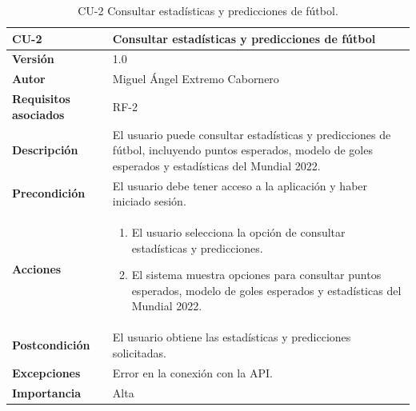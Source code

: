 \begin{table}[p]
    \centering
    \begin{tabularx}{\linewidth}{ p{} p{} }
        \toprule
        \textbf{CU-2}    & \textbf{Consultar estadísticas y predicciones de fútbol}\\
        \toprule
        \textbf{Versión}              & 1.0    \\
        \textbf{Autor}                & Miguel Ángel Extremo Cabornero \\
        \textbf{Requisitos asociados} & RF-2 \\
        \textbf{Descripción}          & El usuario puede consultar estadísticas y predicciones de fútbol, incluyendo puntos esperados, modelo de goles esperados y estadísticas del Mundial 2022. \\
        \textbf{Precondición}         & El usuario debe tener acceso a la aplicación y haber iniciado sesión. \\
        \textbf{Acciones}             &
        \begin{enumerate}
            \item El usuario selecciona la opción de consultar estadísticas y predicciones.
            \item El sistema muestra opciones para consultar puntos esperados, modelo de goles esperados y estadísticas del Mundial 2022.
        \end{enumerate}\\
        \textbf{Postcondición}        & El usuario obtiene las estadísticas y predicciones solicitadas. \\
        \textbf{Excepciones}          & Error en la conexión con la API. \\
        \textbf{Importancia}          & Alta \\
        \bottomrule
    \end{tabularx}
    \caption{CU-2 Consultar estadísticas y predicciones de fútbol.}
\end{table}


